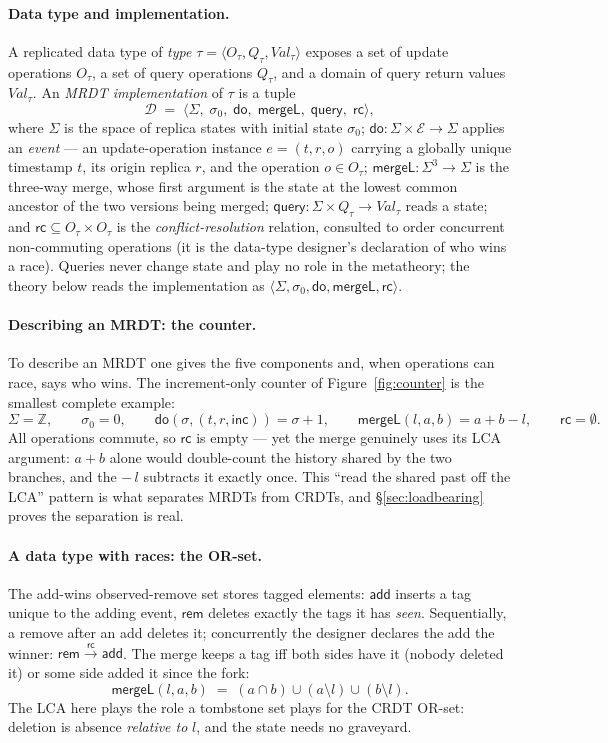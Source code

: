 \documentclass[11pt]{article}
\newcommand{\rc}{\xrightarrow{\mathsf{rc}}}
\newcommand{\add}{\mathsf{add}}
\newcommand{\rem}{\mathsf{rem}}
\newcommand{\mergeL}{\mathsf{mergeL}}
\newcommand{\Sinit}{\sigma_0}
\newcommand{\M}[1]{\mathcal{#1}}
\begin{document}
\paragraph{Data type and implementation.} A replicated data type of
\emph{type} $\tau = \langle O_\tau, Q_\tau, \mathit{Val}_\tau\rangle$
exposes a set of update operations $O_\tau$, a set of query operations
$Q_\tau$, and a domain of query return values $\mathit{Val}_\tau$. An
\emph{MRDT implementation} of $\tau$ is a tuple
\[
  \M{D} \;=\; \langle \Sigma,\; \Sinit,\; \mathsf{do},\; \mergeL,\;
  \mathsf{query},\; \mathsf{rc} \rangle ,
\]
where $\Sigma$ is the space of replica states with initial state
$\Sinit$; $\mathsf{do} : \Sigma \times \M{E} \to \Sigma$ applies an
\emph{event} --- an update-operation instance $e = (t, r, o)$ carrying a
globally unique timestamp $t$, its origin replica $r$, and the operation
$o \in O_\tau$; $\mergeL : \Sigma^3 \to \Sigma$ is the three-way merge,
whose first argument is the state at the lowest common ancestor of the
two versions being merged; $\mathsf{query} : \Sigma \times Q_\tau \to
\mathit{Val}_\tau$ reads a state; and $\mathsf{rc} \subseteq O_\tau
\times O_\tau$ is the \emph{conflict-resolution} relation, consulted to
order concurrent non-commuting operations (it is the data-type designer's
declaration of who wins a race). Queries never change state and play no
role in the metatheory; the theory below reads the implementation as
$\langle \Sigma, \Sinit, \mathsf{do}, \mergeL, \mathsf{rc}\rangle$.

\paragraph{Describing an MRDT: the counter.} To describe an MRDT one
gives the five components and, when operations can race, says who wins.
The increment-only counter of Figure~\ref{fig:counter} is the smallest
complete example:
\[
  \Sigma = \mathbb{Z}, \qquad \Sinit = 0, \qquad
  \mathsf{do}(\sigma, (t,r,\mathsf{inc})) = \sigma + 1, \qquad
  \mergeL(l,a,b) = a + b - l, \qquad \mathsf{rc} = \emptyset .
\]
All operations commute, so $\mathsf{rc}$ is empty --- yet the merge
genuinely uses its LCA argument: $a + b$ alone would double-count the
history shared by the two branches, and the $-\,l$ subtracts it exactly
once. This ``read the shared past off the LCA'' pattern is what
separates MRDTs from CRDTs, and \S\ref{sec:loadbearing} proves the
separation is real.

\paragraph{A data type with races: the OR-set.} The add-wins observed-remove
set stores tagged elements: $\add$ inserts a tag unique to the adding
event, $\rem$ deletes exactly the tags it has \emph{seen}. Sequentially,
a remove after an add deletes it; concurrently the designer declares the
add the winner: $\rem \rc \add$. The merge keeps a tag iff both sides
have it (nobody deleted it) or some side added it since the fork:
\[
  \mergeL(l,a,b) \;=\; (a \cap b) \cup (a \setminus l) \cup (b \setminus l).
\]
The LCA here plays the role a tombstone set plays for the CRDT OR-set:
deletion is absence \emph{relative to} $l$, and the state needs no
graveyard.
\end{document}
